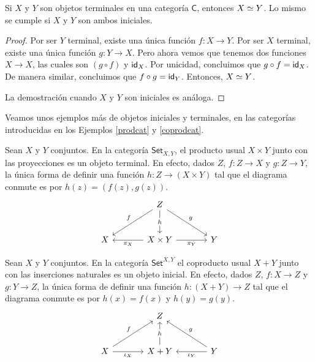 \documentclass[../main.tex]{subfiles}
\begin{document}
\begin{theoremap}
    Si $X$ y $Y$ son objetos terminales en una categor\'ia $\mathsf{C}$, entonces $\eqv{X}{Y}$. Lo mismo se cumple si $X$ y $Y$ son ambos iniciales.
\end{theoremap}
\begin{proof}
    Por ser $Y$ terminal, existe una \'unica funci\'on $f: X \to Y$. Por ser $X$ terminal, existe una \'unica funci\'on $g: Y \to X$. Pero ahora vemos que tenemos dos funciones $X \to X$, las cuales son $(g\circ f)$ y $\idfunc[X]$. Por unicidad, concluimos que $g\circ f = \idfunc[X]$. De manera similar, concluimos que $f \circ g = \idfunc[Y]$. Entonces, $\eqv{X}{Y}$.

    La demostraci\'on cuando $X$ y $Y$ son iniciales es an\'aloga.
\end{proof}

Veamos unos ejemplos m\'as de objetos iniciales y terminales, en las categor\'ias introducidas en los Ejemplos \ref{prodcat} y \ref{coprodcat}.

\begin{exampleap}
    Sean $X$ y $Y$ conjuntos. En la categor\'ia $\mathsf{Set}_{X,Y}$, el producto usual $X \times Y$ junto con las proyecciones es un objeto terminal.
    En efecto, dados $Z$, $f:Z \to X$ y $g:Z\to Y$, la \'unica forma de definir una funci\'on $h:Z \to (X \times Y)$ tal que el diagrama conmute es por $h(z)=(f(z),g(z))$.
    \[\begin{tikzcd}[row sep=large,column sep=large]
            & Z \\
            X & {X \times Y} & Y
            \arrow["f"', from=1-2, to=2-1]
            \arrow["{\pi_X}", from=2-2, to=2-1]
            \arrow["g", from=1-2, to=2-3]
            \arrow["{\pi_Y}"', from=2-2, to=2-3]
            \arrow["h"{description}, from=1-2, to=2-2]
        \end{tikzcd}\]
\end{exampleap}

\begin{exampleap}
    Sean $X$ y $Y$ conjuntos. En la categor\'ia $\mathsf{Set}^{X,Y}$ el coproducto usual $X + Y$ junto con las inserciones naturales es un objeto inicial.
    En efecto, dados $Z$, $f:X \to Z$ y $g:Y\to Z$, la \'unica forma de definir una funci\'on $h: (X + Y) \to Z$ tal que el diagrama conmute es por $h(x)=f(x)$ y $h(y)=g(y)$.
    \[\begin{tikzcd}[row sep=large,column sep=large]
            & Z \\
            X & {X+Y} & Y
            \arrow["f", from=2-1, to=1-2]
            \arrow["{\iota_X}"', from=2-1, to=2-2]
            \arrow["g"', from=2-3, to=1-2]
            \arrow["\iota_Y", from=2-3, to=2-2]
            \arrow["h"{description}, from=2-2, to=1-2]
        \end{tikzcd}\]
\end{exampleap}
\end{document}
